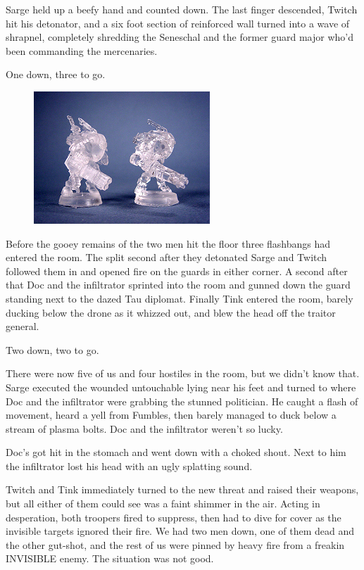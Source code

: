 Sarge held up a beefy hand and counted down. 
The last finger descended, Twitch hit his detonator, and a six foot section of reinforced wall turned into a wave of shrapnel, completely shredding the Seneschal and the former guard major who'd been commanding the mercenaries.

One down, three to go.

\begin{figure}
	\begin{center}
		\includegraphics[width=\figwidth]{pics/10/63.png}
	\end{center}
\end{figure}
Before the gooey remains of the two men hit the floor three flashbangs had entered the room. 
The split second after they detonated Sarge and Twitch followed them in and opened fire on the guards in either corner. 
A second after that Doc and the infiltrator sprinted into the room and gunned down the guard standing next to the dazed Tau diplomat. 
Finally Tink entered the room, barely ducking below the drone as it whizzed out, and blew the head off the traitor general.

Two down, two to go.

There were now five of us and four hostiles in the room, but we didn't know that. 
Sarge executed the wounded untouchable lying near his feet and turned to where Doc and the infiltrator were grabbing the stunned politician. 
He caught a flash of movement, heard a yell from Fumbles, then barely managed to duck below a stream of plasma bolts. 
Doc and the infiltrator weren't so lucky.

Doc's got hit in the stomach and went down with a choked shout. 
Next to him the infiltrator lost his head with an ugly splatting sound.

Twitch and Tink immediately turned to the new threat and raised their weapons, but all either of them could see was a faint shimmer in the air. 
Acting in desperation, both troopers fired to suppress, then had to dive for cover as the invisible targets ignored their fire. 
We had two men down, one of them dead and the other gut-shot, and the rest of us were pinned by heavy fire from a freakin INVISIBLE enemy. 
The situation was not good.

